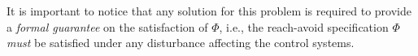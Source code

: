 \begin{comment}
\begin{description}
	\item[Inputs:] Control systems $\Sigma^i=(X^i,x_\init^i,U^i,W^i,f^i)$, $i\in [1;N]$, and the global specification $\Phi=\lnot\avoid\,\mathcal{U}\,\goal$.%
	\item[Parameters:] A robustness margin $\varepsilon\in \reals^n_{>0}$.%
	\item[Output:] Local feedback controllers $\set{C^i}$ for $\set{\Sigma^i}$, $i\in [1;N]$, such that $\set{C^i}\parallel \set{\Sigma^i}$ realizes $\Phi$. 
\end{description}
\end{comment}

It is important to notice that any solution for this problem is required to provide a \emph{formal guarantee} on the satisfaction of $\Phi$, 
i.e., the reach-avoid specification $\Phi$ \emph{must} be satisfied under any disturbance affecting the control systems.

